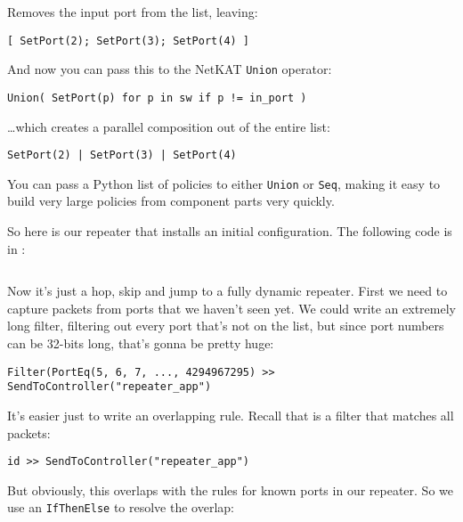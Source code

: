 Removes the input port from the list, leaving:

\begin{verbatim}
[ SetPort(2); SetPort(3); SetPort(4) ]
\end{verbatim}

And now you can pass this to the NetKAT \texttt{Union} operator:

\begin{verbatim}
Union( SetPort(p) for p in sw if p != in_port )
\end{verbatim}

\ldots which creates a parallel composition out of the entire list:

\begin{verbatim}
SetPort(2) | SetPort(3) | SetPort(4)
\end{verbatim}

You can pass a Python list of policies to either \texttt{Union} or \texttt{Seq}, making it easy to build 
very large policies from component parts very quickly.  

So here is our repeater that installs an initial configuration.
The following code is in :

\inputminted{python}{code/netkat_principles/repeater4.py}

Now it's just a hop, skip and  jump to a fully dynamic repeater.  First we need to capture packets from ports
that we haven't seen yet.  We could write an extremely long filter, filtering out every port that's not on the
list, but since port numbers can be 32-bits long, that's gonna be pretty huge:

\begin{verbatim}
Filter(PortEq(5, 6, 7, ..., 4294967295) >> SendToController("repeater_app")
\end{verbatim}

It's easier just to write an overlapping rule.  Recall that  is a filter that matches all packets:

\begin{verbatim}
id >> SendToController("repeater_app")
\end{verbatim}

But obviously, this overlaps with the rules for known ports in our repeater.  So we use an \texttt{IfThenElse} to 
resolve the overlap:

\inputminted[firstline=16,lastline=33]{python}{code/netkat_principles/repeater5.py}

